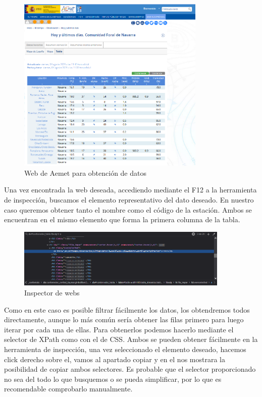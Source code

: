 \begin{figure} [H]
	\centering
	\includegraphics[width=0.8\textwidth]{fig/code_aemet.png}
	\caption[URL de inicio para obtener los códigos de las estaciones de Aemet]{Web de Aemet para obtención de datos}
	\label{fig:ej13}
\end{figure}

Una vez encontrada la web deseada, accediendo mediante el F12 a la herramienta de inspección, buscamos el elemento representativo del dato deseado. En nuestro caso queremos obtener tanto el nombre como el código de la estación. Ambos se encuentran en el mismo elemento que forma la primera columna de la tabla.\newline

\begin{figure} [H]
	\centering
	\includegraphics[width=0.9\textwidth]{fig/inspector.png}
	\caption[Inspector de webs de Chrome]{Inspector de webs}
	\label{fig:ej14}
\end{figure}

Como en este caso es posible filtrar fácilmente los datos, los obtendremos todos directamente, aunque lo más común sería obtener las filas primero para luego iterar por cada una de ellas. Para obtenerlos podemos hacerlo mediante el selector de XPath como con el de CSS.\newline
\newline
Ambos se pueden obtener fácilmente en la herramienta de inspección, una vez seleccionado el elemento deseado, hacemos click derecho sobre el, vamos al apartado copiar y en el nos mostrara la posibilidad de copiar ambos selectores. Es probable que el selector proporcionado no sea del todo lo que busquemos o se pueda simplificar, por lo que es recomendable comprobarlo manualmente.\newline

